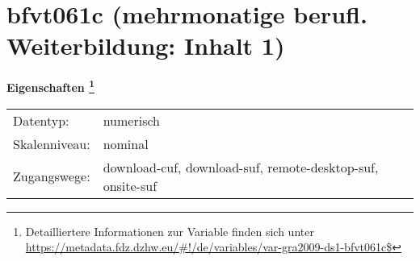 
    \setcounter{footnote}{0}

    \vspace*{-1.8cm}
	\section{bfvt061c (mehrmonatige berufl. Weiterbildung: Inhalt 1)}
	\label{section:bfvt061c}



    \vspace*{0.5cm}
    \noindent\textbf{Eigenschaften
	\footnote{Detailliertere Informationen zur Variable finden sich unter
		\url{https://metadata.fdz.dzhw.eu/\#!/de/variables/var-gra2009-ds1-bfvt061c$}}}\\
	\begin{tabularx}{\hsize}{@{}lX}
	Datentyp: & numerisch \\
	Skalenniveau: & nominal \\
	Zugangswege: &
	  download-cuf, 
	  download-suf, 
	  remote-desktop-suf, 
	  onsite-suf
 \\
    \end{tabularx}



